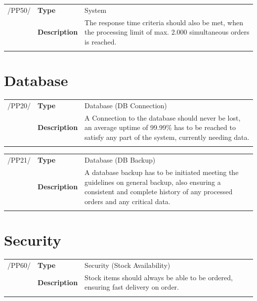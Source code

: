 \documentclass[11pt,a4paper,oneside,svgnames]{report}
\begin{document}
\noindent
\begin{tabular}{llp{8.75cm}}
\cellcolor{white}/PP50/	& \textbf{Type}			& System\\
\cellcolor{white}		& \textbf{Description}	& The response time criteria should also be met, when the processing limit of max. 2.000 simultaneous orders is reached.\\
\cellcolor{white}		\hfill \\
\end{tabular}

\section{Database}

\noindent
\begin{tabular}{llp{8.75cm}}
\cellcolor{white}/PP20/	& \textbf{Type}			& Database (DB Connection)\\
\cellcolor{white}		& \textbf{Description}	& A Connection to the database should never be lost, an average uptime of 99.99\% has to be reached to satisfy any part of the system, currently needing data.\\
\cellcolor{white}		\hfill \\
\end{tabular}

\noindent
\begin{tabular}{llp{8.75cm}}
\cellcolor{white}/PP21/	& \textbf{Type}			& Database (DB Backup)\\
\cellcolor{white}		& \textbf{Description}	& A database backup has to be initiated meeting the guidelines on general backup, also ensuring a consistent and complete history of any processed orders and any critical data.\\
\cellcolor{white}		\hfill \\
\end{tabular}

\section{Security}
\noindent
\begin{tabular}{llp{8.75cm}}
\cellcolor{white}/PP60/	& \textbf{Type}			& Security (Stock Availability)\\
\cellcolor{white}		& \textbf{Description}	& Stock items should always be able to be ordered, ensuring fast delivery on order.\\
\cellcolor{white}		\hfill \\
\end{tabular}
\end{document}

